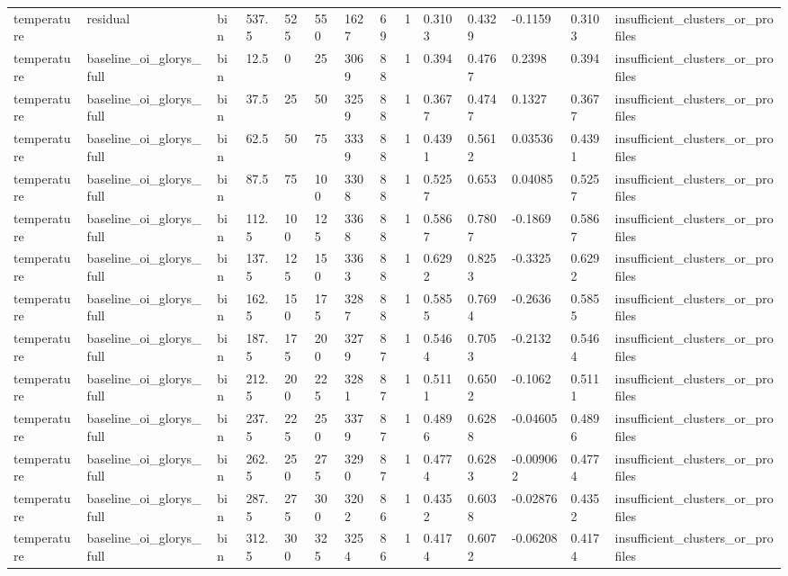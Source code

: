\begin{table}[htbp]
\begin{tabular}{llllllllllllll}
temperature & residual & bin & 537.5 & 525 & 550 & 1627 & 69 & 1 & 0.3103 & 0.4329 & -0.1159 & 0.3103 & insufficient\_clusters\_or\_profiles \\
temperature & baseline\_oi\_glorys\_full & bin & 12.5 & 0 & 25 & 3069 & 88 & 1 & 0.394 & 0.4767 & 0.2398 & 0.394 & insufficient\_clusters\_or\_profiles \\
temperature & baseline\_oi\_glorys\_full & bin & 37.5 & 25 & 50 & 3259 & 88 & 1 & 0.3677 & 0.4747 & 0.1327 & 0.3677 & insufficient\_clusters\_or\_profiles \\
temperature & baseline\_oi\_glorys\_full & bin & 62.5 & 50 & 75 & 3339 & 88 & 1 & 0.4391 & 0.5612 & 0.03536 & 0.4391 & insufficient\_clusters\_or\_profiles \\
temperature & baseline\_oi\_glorys\_full & bin & 87.5 & 75 & 100 & 3308 & 88 & 1 & 0.5257 & 0.653 & 0.04085 & 0.5257 & insufficient\_clusters\_or\_profiles \\
temperature & baseline\_oi\_glorys\_full & bin & 112.5 & 100 & 125 & 3368 & 88 & 1 & 0.5867 & 0.7807 & -0.1869 & 0.5867 & insufficient\_clusters\_or\_profiles \\
temperature & baseline\_oi\_glorys\_full & bin & 137.5 & 125 & 150 & 3363 & 88 & 1 & 0.6292 & 0.8253 & -0.3325 & 0.6292 & insufficient\_clusters\_or\_profiles \\
temperature & baseline\_oi\_glorys\_full & bin & 162.5 & 150 & 175 & 3287 & 88 & 1 & 0.5855 & 0.7694 & -0.2636 & 0.5855 & insufficient\_clusters\_or\_profiles \\
temperature & baseline\_oi\_glorys\_full & bin & 187.5 & 175 & 200 & 3279 & 87 & 1 & 0.5464 & 0.7053 & -0.2132 & 0.5464 & insufficient\_clusters\_or\_profiles \\
temperature & baseline\_oi\_glorys\_full & bin & 212.5 & 200 & 225 & 3281 & 87 & 1 & 0.5111 & 0.6502 & -0.1062 & 0.5111 & insufficient\_clusters\_or\_profiles \\
temperature & baseline\_oi\_glorys\_full & bin & 237.5 & 225 & 250 & 3379 & 87 & 1 & 0.4896 & 0.6288 & -0.04605 & 0.4896 & insufficient\_clusters\_or\_profiles \\
temperature & baseline\_oi\_glorys\_full & bin & 262.5 & 250 & 275 & 3290 & 87 & 1 & 0.4774 & 0.6283 & -0.009062 & 0.4774 & insufficient\_clusters\_or\_profiles \\
temperature & baseline\_oi\_glorys\_full & bin & 287.5 & 275 & 300 & 3202 & 86 & 1 & 0.4352 & 0.6038 & -0.02876 & 0.4352 & insufficient\_clusters\_or\_profiles \\
temperature & baseline\_oi\_glorys\_full & bin & 312.5 & 300 & 325 & 3254 & 86 & 1 & 0.4174 & 0.6072 & -0.06208 & 0.4174 & insufficient\_clusters\_or\_profiles \\

\end{tabular}
\end{table}
